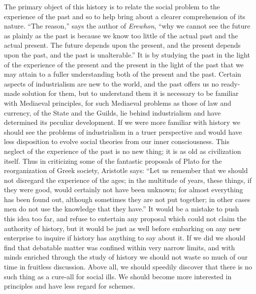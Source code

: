\documentclass{book}
\begin{document}
\label{chapter-0}
The primary object of this history is to relate the social problem to the experience of the past and so to help bring about a clearer comprehension of its nature. “The reason,” says the author of \emph{Erewhon}, “why we cannot see the future as plainly as the past is because we know too little of the actual past and the actual present. The future depends upon the present, and the present depends upon the past, and the past is unalterable.” It is by studying the past in the light of the experience of the present and the present in the light of the past that we may attain to a fuller understanding both of the present and the past. Certain aspects of industrialism are new to the world, and the past offers us no ready-made solution for them, but to understand them it is necessary to be familiar with Mediaeval principles, for such Mediaeval problems as those of law and currency, of the State and the Guilds, lie behind industrialism and have determined its peculiar development. If we were more familiar with history we should see the problems of industrialism in a truer perspective and would have less disposition to evolve social theories from our inner consciousness. This neglect of the experience of the past is no new thing; it is as old as civilization itself. Thus in criticizing some of the fantastic proposals of Plato for the reorganization of Greek society, Aristotle says: “Let us remember that we should not disregard the experience of the ages; in the multitude of years, these things, if they were good, would certainly not have been unknown; for almost everything has been found out, although sometimes they are not put together; in other cases men do not use the knowledge that they have.” It would be a mistake to push this idea too far, and refuse to entertain any proposal which could not claim the authority of history, but it would be just as well before embarking on any new enterprise to inquire if history has anything to say about it. If we did we should find that debatable matter was confined within very narrow limits, and with minds enriched through the study of history we should not waste so much of our time in fruitless discussion. Above all, we should speedily discover that there is no such thing as a cure-all for social ills. We should become more interested in principles and have less regard for schemes.
\end{document}
